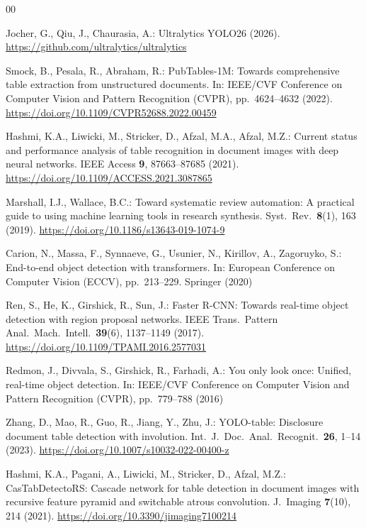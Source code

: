 \documentclass[pdflatex,sn-mathphys-num,iicol]{sn-jnl}
\begin{document}
\begin{thebibliography}{00}

Jocher, G., Qiu, J., Chaurasia, A.:
Ultralytics YOLO26 (2026).
\url{https://github.com/ultralytics/ultralytics}

Smock, B., Pesala, R., Abraham, R.:
PubTables-1M: Towards comprehensive table extraction from unstructured documents.
In: IEEE/CVF Conference on Computer Vision and Pattern Recognition (CVPR),
pp.~4624--4632 (2022).
\url{https://doi.org/10.1109/CVPR52688.2022.00459}

Hashmi, K.A., Liwicki, M., Stricker, D., Afzal, M.A., Afzal, M.Z.:
Current status and performance analysis of table recognition in document
images with deep neural networks.
IEEE Access \textbf{9}, 87663--87685 (2021).
\url{https://doi.org/10.1109/ACCESS.2021.3087865}

Marshall, I.J., Wallace, B.C.:
Toward systematic review automation: A practical guide to using machine learning
tools in research synthesis.
Syst.\ Rev.\ \textbf{8}(1), 163 (2019).
\url{https://doi.org/10.1186/s13643-019-1074-9}

Carion, N., Massa, F., Synnaeve, G., Usunier, N., Kirillov, A., Zagoruyko, S.:
End-to-end object detection with transformers.
In: European Conference on Computer Vision (ECCV), pp.~213--229. Springer (2020)

Ren, S., He, K., Girshick, R., Sun, J.:
Faster R-CNN: Towards real-time object detection with region proposal networks.
IEEE Trans.\ Pattern Anal.\ Mach.\ Intell.\ \textbf{39}(6), 1137--1149 (2017).
\url{https://doi.org/10.1109/TPAMI.2016.2577031}

Redmon, J., Divvala, S., Girshick, R., Farhadi, A.:
You only look once: Unified, real-time object detection.
In: IEEE/CVF Conference on Computer Vision and Pattern Recognition (CVPR),
pp.~779--788 (2016)

Zhang, D., Mao, R., Guo, R., Jiang, Y., Zhu, J.:
YOLO-table: Disclosure document table detection with involution.
Int.\ J.\ Doc.\ Anal.\ Recognit.\ \textbf{26}, 1--14 (2023).
\url{https://doi.org/10.1007/s10032-022-00400-z}

Hashmi, K.A., Pagani, A., Liwicki, M., Stricker, D., Afzal, M.Z.:
CasTabDetectoRS: Cascade network for table detection in document images with
recursive feature pyramid and switchable atrous convolution.
J.\ Imaging \textbf{7}(10), 214 (2021).
\url{https://doi.org/10.3390/jimaging7100214}


\end{thebibliography}
\end{document}
